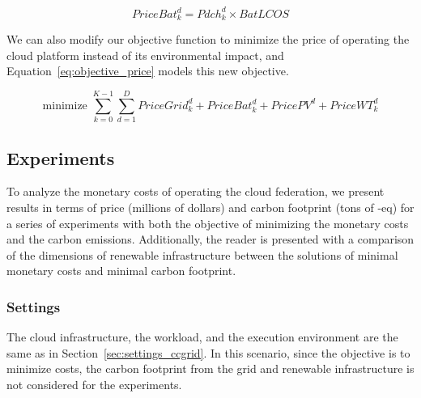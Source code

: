 \begin{equation} \label{eq:pricebat}
   PriceBat^d_k = Pdch^d_k \times BatLCOS
\end{equation}


We can also modify our objective function to minimize the price of operating the cloud platform instead of its environmental impact, and Equation~\eqref{eq:objective_price} models this new objective.
  
\begin{equation} \label{eq:objective_price}
\text{minimize }\sum_{k=0}^{K-1} \sum_{d=1}^D PriceGrid^d_k  + PriceBat^d_k + PricePV^d+ PriceWT^d_k
\end{equation}


\subsection{Experiments}

To analyze the monetary costs of operating the cloud federation, we present results in terms of price (millions of dollars) and carbon footprint (tons of -eq) for a series of experiments with both the objective of minimizing the monetary costs and the carbon emissions. Additionally, the reader is presented with a comparison of the dimensions of renewable infrastructure between the solutions of minimal monetary costs and minimal carbon footprint.

\subsubsection{Settings}

The cloud infrastructure, the workload, and the execution environment are the same as in Section~\ref{sec:settings_ccgrid}. In this scenario, since the objective is to minimize costs, the carbon footprint from the grid and renewable infrastructure is not considered for the experiments.

